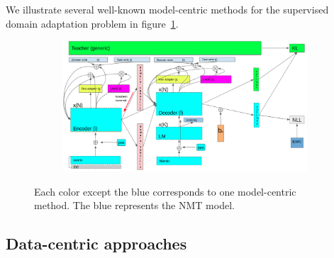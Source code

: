 We illustrate several well-known model-centric methods for the supervised domain adaptation problem in figure~\ref{fig:model-centric-case1-case2}.
\begin{figure}[htbp]
\begin{subfigure}{1.0\textwidth}
  \centering
  \includegraphics[width=1.0\textwidth]{graphics/supervised_mdmt}
\end{subfigure}
\newline
\begin{subfigure}{1.0\textwidth}
  \centering
\end{subfigure}
\caption[Model-centric's brief overview]{Each color except the blue corresponds to one model-centric method. The blue represents the NMT model.}
\label{fig:model-centric-case1-case2}
\end{figure}

\subsection{Data-centric approaches}
